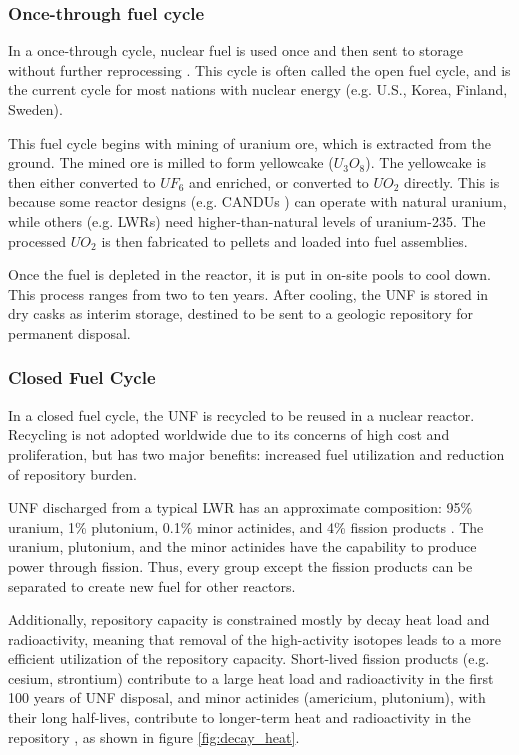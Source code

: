 \subsubsection{Once-through fuel cycle}

In a once-through cycle, nuclear fuel is used once and then sent to 
storage without further reprocessing \cite{tsoulfanidis_nuclear_2013}.
This cycle is often called the open fuel cycle, and is the current cycle for
most nations with nuclear energy (e.g. U.S., Korea, Finland, Sweden).

This fuel cycle begins with mining of uranium ore, which is extracted from the
ground. The mined ore is milled to form yellowcake ($U_3O_8$). 
The yellowcake is then either converted to $UF_6$ and enriched, or converted
to $UO_2$ directly. This is because some reactor designs (e.g. \glspl{CANDU} \cite{torgerson_candu_2006})
can operate with natural uranium, while others (e.g. \glspl{LWR}) need
higher-than-natural levels of uranium-235. The processed $UO_2$ is
then fabricated to pellets and loaded into fuel assemblies. 

Once the fuel is depleted in the reactor, it is put in on-site pools to cool down.
This process ranges from two to ten years. After cooling, the \gls{UNF}
is stored in dry casks as interim storage, destined to be sent to a geologic repository
for permanent disposal.

\subsubsection{Closed Fuel Cycle}
In a closed fuel cycle, the \gls{UNF} is recycled to be reused
in a nuclear reactor. Recycling is not adopted worldwide due to
its concerns of high cost and proliferation, but has two major
benefits: increased fuel utilization and reduction of repository
burden. 

\gls{UNF} discharged from a typical \gls{LWR} has an approximate
composition: 95\% uranium, 1\% plutonium, 0.1\%
minor actinides, and 4\% fission products \cite{feiveson_spent_2011}.
The uranium, plutonium, and the minor actinides have the capability
to produce power through fission. Thus, every group except the
fission products can be separated to create new fuel for other reactors.

Additionally, repository capacity is constrained mostly by decay heat
load and radioactivity, meaning that removal of the high-activity
isotopes leads to a more efficient utilization of the repository
capacity. Short-lived fission products (e.g. cesium, strontium) contribute
to a large heat load and radioactivity in the first 100 years of \gls{UNF} disposal,
and minor actinides (americium, plutonium), with their long half-lives,
contribute to longer-term heat and radioactivity in the repository \cite{wigeland_separations_2006},
as shown in figure \ref{fig:decay_heat}.


